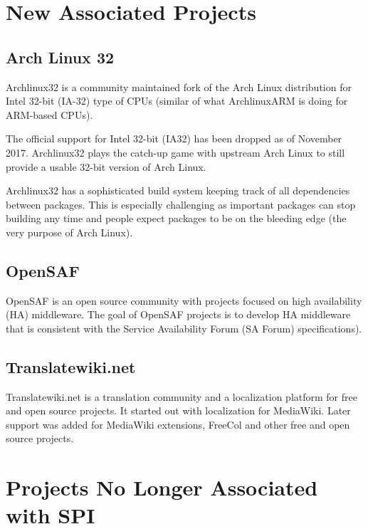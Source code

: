 \documentclass[a4paper]{report}
\begin{document}
\section{New Associated Projects}

\subsection{Arch Linux 32}

Archlinux32 is a community maintained fork of the Arch Linux
distribution for Intel 32-bit (IA-32) type of CPUs (similar of what
ArchlinuxARM is doing for ARM-based CPUs).

The official support for Intel 32-bit (IA32) has been dropped as of
November 2017.  Archlinux32 plays the catch-up game with upstream Arch
Linux to still provide a usable 32-bit version of Arch Linux.

Archlinux32 has a sophisticated build system keeping track of all
dependencies between packages.  This is especially challenging as
important packages can stop building any time and people expect packages
to be on the bleeding edge (the very purpose of Arch Linux).

\subsection{OpenSAF}

OpenSAF is an open source community with projects focused on high
availability (HA) middleware.  The goal of OpenSAF projects is to
develop HA middleware that is consistent with the Service Availability
Forum (SA Forum) specifications).

\subsection{Translatewiki.net}

Translatewiki.net is a translation community and a localization platform
for free and open source projects. It started out with localization for
MediaWiki. Later support was added for MediaWiki extensions, FreeCol and
other free and open source projects.

\section{Projects No Longer Associated with SPI}
\end{document}
